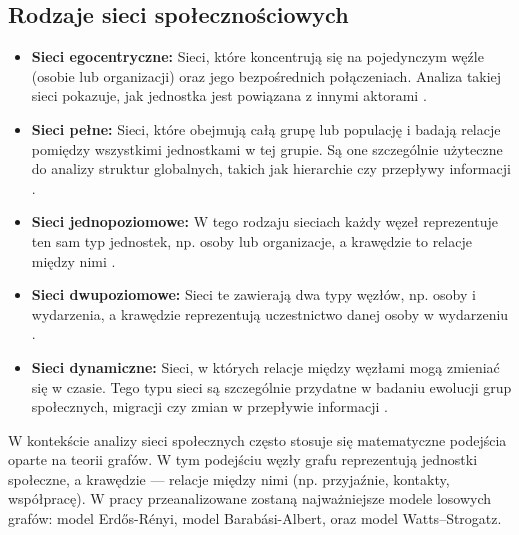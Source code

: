 \subsection{Rodzaje sieci społecznościowych}
\begin{itemize}
    \item \textbf{Sieci egocentryczne:} Sieci, które koncentrują się na pojedynczym węźle (osobie lub organizacji) oraz jego bezpośrednich połączeniach.
          Analiza takiej sieci pokazuje, jak jednostka jest powiązana z innymi aktorami \cite{Hanneman2005}.
    \item \textbf{Sieci pełne:} Sieci, które obejmują całą grupę lub populację i badają relacje pomiędzy wszystkimi jednostkami w tej grupie.
          Są one szczególnie użyteczne do analizy struktur globalnych, takich jak hierarchie czy przepływy informacji \cite{Scott2000}.
    \item \textbf{Sieci jednopoziomowe:} W tego rodzaju sieciach każdy węzeł reprezentuje ten sam typ jednostek, np. osoby lub organizacje,
          a krawędzie to relacje między nimi \cite{Newman2010}.
    \item \textbf{Sieci dwupoziomowe:} Sieci te zawierają dwa typy węzłów, np. osoby i wydarzenia, a krawędzie reprezentują uczestnictwo danej osoby w wydarzeniu \cite{Borgatti1997}.
    \item \textbf{Sieci dynamiczne:} Sieci, w których relacje między węzłami mogą zmieniać się w czasie.
          Tego typu sieci są szczególnie przydatne w badaniu ewolucji grup społecznych, migracji czy zmian w przepływie informacji \cite{Holme2012}.
\end{itemize}

W kontekście analizy sieci społecznych często stosuje się matematyczne podejścia oparte na teorii grafów.
W tym podejściu węzły grafu reprezentują jednostki społeczne, a krawędzie — relacje między nimi (np. przyjaźnie, kontakty, współpracę).
W pracy przeanalizowane zostaną najważniejsze modele losowych grafów: model Erdős-Rényi, model Barabási-Albert, oraz model Watts–Strogatz.